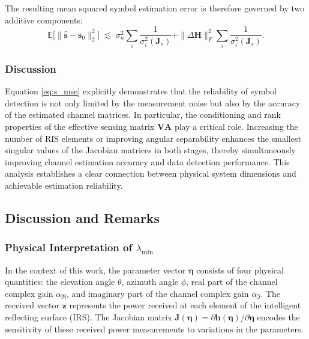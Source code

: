 \documentclass[journal]{IEEEtran}
\begin{document}
The resulting mean squared symbol estimation error is therefore governed by two additive components:
\begin{equation}
\label{eq:s_mse}
\mathbb{E}
\big[
\|
\hat{\mathbf{s}}-\mathbf{s}_0
\|_2^2
\big]
\;\lesssim\;
\sigma_n^2
\sum_i
\frac{1}{\sigma_i^2(\mathbf{J}_s)}
+
\|
\Delta\mathbf{H}
\|_F^2
\sum_i
\frac{1}{\sigma_i^2(\mathbf{J}_s)}.
\end{equation}

\subsubsection{Discussion}

Equation \eqref{eq:s_mse} explicitly demonstrates that the reliability of symbol detection is not only limited by the measurement noise but also by the accuracy of the estimated channel matrices. In particular, the conditioning and rank properties of the effective sensing matrix $\mathbf{V}\mathbf{A}$ play a critical role. Increasing the number of RIS elements or improving angular separability enhances the smallest singular values of the Jacobian matrices in both stages, thereby simultaneously improving channel estimation accuracy and data detection performance. This analysis establishes a clear connection between physical system dimensions and achievable estimation reliability.


\subsection{Discussion and Remarks}
\label{subsec:discussion}

\subsubsection{Physical Interpretation of $\lambda_{\min}$}
\label{subsubsec:physical-lambda}

In the context of this work, the parameter vector $\boldsymbol{\eta}$ consists of four physical quantities: the elevation angle $\theta$, azimuth angle $\phi$, real part of the channel complex gain $\alpha_{\Re}$, and imaginary part of the channel complex gain $\alpha_{\Im}$. The received vector $\mathbf{z}$ represents the power received at each element of the intelligent reflecting surface (IRS). The Jacobian matrix $\mathbf{J}(\boldsymbol{\eta}) = \partial \mathbf{h}(\boldsymbol{\eta}) / \partial \boldsymbol{\eta}$ encodes the sensitivity of these received power measurements to variations in the parameters.
\end{document}
